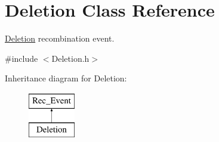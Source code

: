 \hypertarget{classDeletion}{}\section{Deletion Class Reference}
\label{classDeletion}


\hyperlink{classDeletion}{Deletion} recombination event.  




{\ttfamily \#include $<$Deletion.\+h$>$}

Inheritance diagram for Deletion\+:\begin{figure}[H]
\begin{center}
\leavevmode
\includegraphics[height=2.000000cm]{d2/df0/classDeletion}
\end{center}
\end{figure}
